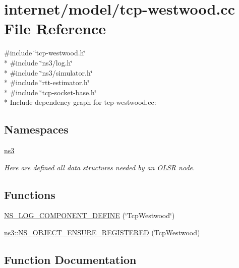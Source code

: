 \hypertarget{tcp-westwood_8cc}{}\section{internet/model/tcp-\/westwood.cc File Reference}
\label{tcp-westwood_8cc}
{\ttfamily \#include \char`\"{}tcp-\/westwood.\+h\char`\"{}}\\*
{\ttfamily \#include \char`\"{}ns3/log.\+h\char`\"{}}\\*
{\ttfamily \#include \char`\"{}ns3/simulator.\+h\char`\"{}}\\*
{\ttfamily \#include \char`\"{}rtt-\/estimator.\+h\char`\"{}}\\*
{\ttfamily \#include \char`\"{}tcp-\/socket-\/base.\+h\char`\"{}}\\*
Include dependency graph for tcp-\/westwood.cc\+:
\subsection*{Namespaces}
\begin{DoxyCompactItemize}
\item 
 \hyperlink{namespacens3}{ns3}
\begin{DoxyCompactList}\small\item\em Here are defined all data structures needed by an O\+L\+SR node. \end{DoxyCompactList}\end{DoxyCompactItemize}
\subsection*{Functions}
\begin{DoxyCompactItemize}
\item 
\hyperlink{tcp-westwood_8cc_a30b190007850b961ab8c6447f4bb5377}{N\+S\+\_\+\+L\+O\+G\+\_\+\+C\+O\+M\+P\+O\+N\+E\+N\+T\+\_\+\+D\+E\+F\+I\+NE} (\char`\"{}Tcp\+Westwood\char`\"{})
\item 
\hyperlink{namespacens3_a5183f2337ff656f9ed26703e227c042b}{ns3\+::\+N\+S\+\_\+\+O\+B\+J\+E\+C\+T\+\_\+\+E\+N\+S\+U\+R\+E\+\_\+\+R\+E\+G\+I\+S\+T\+E\+R\+ED} (Tcp\+Westwood)
\end{DoxyCompactItemize}


\subsection{Function Documentation}
